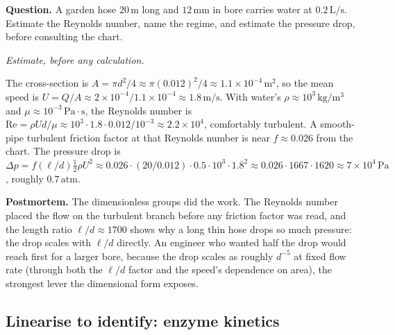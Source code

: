 

\begin{estimation}
\textbf{Question.} A garden hose $20\,\text{m}$ long and $12\,\text{mm}$ in
bore carries water at $0.2\,\text{L/s}$. Estimate the Reynolds number, name
the regime, and estimate the pressure drop, before consulting the chart.

\smallskip
\textit{Estimate, before any calculation.}

\smallskip
The cross-section is $A = \pi d^2/4 \approx \pi (0.012)^2/4 \approx
1.1\times 10^{-4}\,\text{m}^2$, so the mean speed is $U = Q/A \approx
2\times 10^{-4}/1.1\times 10^{-4} \approx 1.8\,\text{m/s}$. With water's
$\rho \approx 10^3\,\si{\kilogram\per\cubic\meter}$ and $\mu \approx
10^{-3}\,\text{Pa}\cdot\text{s}$, the Reynolds number is $\mathrm{Re} =
\rho U d/\mu \approx 10^3 \cdot 1.8 \cdot 0.012/10^{-3} \approx 2.2\times
10^4$, comfortably turbulent. A smooth-pipe turbulent friction factor at
that Reynolds number is near $f \approx 0.026$ from the chart. The pressure
drop is $\Delta p = f (\ell/d)\tfrac{1}{2}\rho U^2 \approx 0.026 \cdot
(20/0.012) \cdot 0.5 \cdot 10^3 \cdot 1.8^2 \approx 0.026 \cdot 1667 \cdot
1620 \approx 7\times 10^4\,\text{Pa}$, roughly $0.7\,\text{atm}$.

\smallskip
\textbf{Postmortem.} The dimensionless groups did the work. The Reynolds
number placed the flow on the turbulent branch before any friction factor
was read, and the length ratio $\ell/d \approx 1700$ shows why a long thin
hose drops so much pressure: the drop scales with $\ell/d$ directly. An
engineer who wanted half the drop would reach first for a larger bore,
because the drop scales as roughly $d^{-5}$ at fixed flow rate (through both
the $\ell/d$ factor and the speed's dependence on area), the strongest
lever the dimensional form exposes.
\end{estimation}

\subsection{Linearise to identify: enzyme kinetics}


